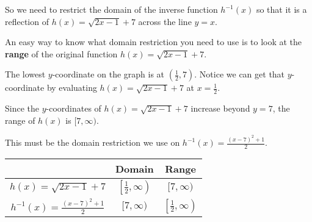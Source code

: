 \begin{solution}
\begin{center}
\end{center}

So we need to restrict the domain of the inverse function $h^{-1}(x)$ so that it is a reflection of $h(x) = \sqrt{2x-1}+7$ across the line $y = x$. \newline 

An easy way to know what domain restriction you need to use is to look at the \textbf{range} of the original function $h(x) = \sqrt{2x-1}+7$. \newline 

The lowest $y$-coordinate on the graph is at $\left(\frac{1}{2}, 7\right)$. Notice we can get that $y$-coordinate by evaluating $h(x) = \sqrt{2x-1}+7$ at $x = \frac{1}{2}$. \newline 

Since the $y$-coordinates of $h(x)=\sqrt{2x-1}+7$ increase beyond $y = 7$, the range of $h(x)$ is $[7, \infty)$. \newline 

This must be the domain restriction we use on $h^{-1}(x) = \frac{(x-7)^2+1}{2}$.

\begin{center}
\begin{tabular}{c|c|c}  
     & Domain & Range \\ \hline 
     $h(x)=\sqrt{2x-1}+7$ & \cellcolor{yellow} $\left[\frac{1}{2}, \infty\right)$ & \cellcolor{green} $[7, \infty)$ \\[4pt] \hline 
     $h^{-1}(x) = \frac{(x-7)^2+1}{2}$ & \cellcolor{green} $[7, \infty)$ & \cellcolor{yellow} $\left[\frac{1}{2}, \infty\right)$ \\[4pt]
\end{tabular}
\end{center}

\begin{center}
\end{center}


\end{solution}
